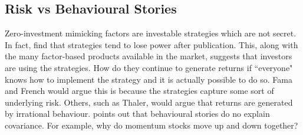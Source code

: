 
\subsection{Risk vs Behavioural Stories}

Zero-investment mimicking factors are investable strategies which are not secret.
In fact, \textcite{mclean2016does} find that strategies tend to lose power after publication.
This, along with the many factor-based products available in the market, suggests that 
investors are using the strategies.
How do they continue to generate returns if ``everyone" knows how to implement the strategy 
and it is actually possible to do so.
Fama and French would argue this is because the strategies capture some sort of underlying 
risk.
Others, such as Thaler, would argue that returns are generated by irrational behaviour.
\textcite{cochrane2011presidential} points out that behavioural stories do no explain 
covariance.
For example, why do momentum stocks move up and down together?
